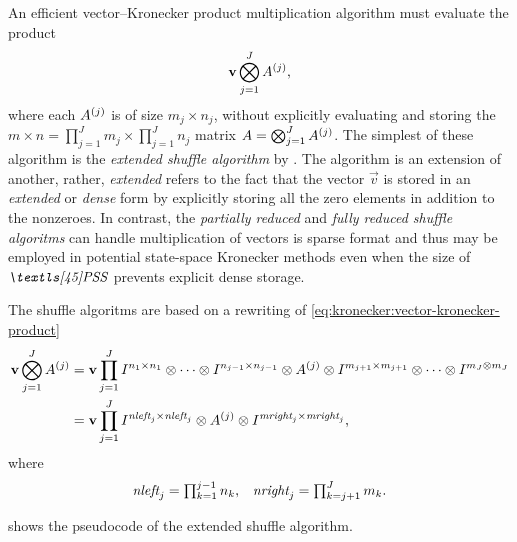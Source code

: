 An efficient vector--Kronecker product multiplication algorithm must
evaluate the product
\begin{equation}
  \boldsymbol{\mathrm{v}} \bigotimes_{j = 1}^J A^{(j)}
  \text, \label{eq:kronecker:vector-kronecker-product}
\end{equation}
where each $A^{(j)}$ is of size $m_j \times n_j$, without explicitly
evaluating and storing the
$m \times n = \prod_{j = 1}^J m_j \times \prod_{j = 1}^J n_j$ matrix
$A = \bigotimes_{j = 1}^J A^{(j)}$. The simplest of these algorithm
is the \emph{extended shuffle algorithm} by
\citet{DBLP:conf/ipps/BenoitPS03}. The algorithm is an extension of
another, rather, \emph{extended} refers to the fact that the vector
$\vec{v}$ is stored in an \emph{extended} or \emph{dense} form by
explicitly storing all the zero elements in addition to the
nonzeroes. In contrast, the \emph{partially reduced} and \emph{fully
  reduced shuffle algoritms}
\citep{DBLP:conf/ipps/BenoitPS03,DBLP:journals/fgcs/BenoitPS06} can
handle multiplication of vectors is sparse format and thus may be
employed in potential state-space Kronecker methods even when the size
of $\PSS$ prevents explicit dense storage.

The shuffle algoritms are based on a rewriting of
\cref{eq:kronecker:vector-kronecker-product}
\begin{align}
  \boldsymbol{\mathrm{v}} \bigotimes_{j = 1}^J A^{(j)}
  &= \boldsymbol{\mathrm{v}} \prod_{j = 1}^J
    I^{n_1 \times n_1} \otimes \cdots \otimes
    I^{n_{j - 1} \times n_{j - 1}} \otimes A^{(j)} \otimes I^{m_{j + 1}
    \times m_{j + 1}} \otimes \cdots \otimes I^{m_J \otimes m_J} \\
  &= \boldsymbol{\mathrm{v}} \prod_{j = 1}^J I^{\textit{nleft}_j \times
    \textit{nleft}_j} \otimes A^{(j)} \otimes I^{\textit{mright}_j
    \times \textit{mright}_j} \text,
\end{align}
where
\begin{equation}
  \begin{aligned}
    \textit{nleft}_j &= \textstyle \prod_{k = 1}^{j - 1} n_k \text,
    & \textit{nright}_j &= \textstyle \prod_{k = j + 1}^{J} m_k \text. \\
  \end{aligned}
\end{equation}

 shows the pseudocode of the extended
shuffle algorithm.

